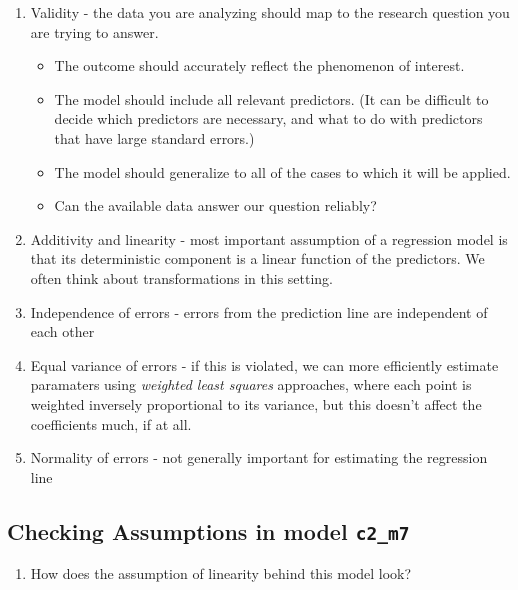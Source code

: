 \documentclass[]{book}
\providecommand{\tightlist}{%
  \setlength{\itemsep}{0pt}\setlength{\parskip}{0pt}}
\theoremstyle{definition}
\theoremstyle{definition}
\theoremstyle{definition}
\theoremstyle{remark}
\begin{document}
\begin{enumerate}
\def\labelenumi{\arabic{enumi}.}
\tightlist
\item
  Validity - the data you are analyzing should map to the research
  question you are trying to answer.

  \begin{itemize}
  \tightlist
  \item
    The outcome should accurately reflect the phenomenon of interest.
  \item
    The model should include all relevant predictors. (It can be
    difficult to decide which predictors are necessary, and what to do
    with predictors that have large standard errors.)
  \item
    The model should generalize to all of the cases to which it will be
    applied.
  \item
    Can the available data answer our question reliably?
  \end{itemize}
\item
  Additivity and linearity - most important assumption of a regression
  model is that its deterministic component is a linear function of the
  predictors. We often think about transformations in this setting.
\item
  Independence of errors - errors from the prediction line are
  independent of each other
\item
  Equal variance of errors - if this is violated, we can more
  efficiently estimate paramaters using \emph{weighted least squares}
  approaches, where each point is weighted inversely proportional to its
  variance, but this doesn't affect the coefficients much, if at all.
\item
  Normality of errors - not generally important for estimating the
  regression line
\end{enumerate}

\subsection{\texorpdfstring{Checking Assumptions in model
\texttt{c2\_m7}}{Checking Assumptions in model c2\_m7}}\label{checking-assumptions-in-model-c2_m7}

\begin{enumerate}
\def\labelenumi{\arabic{enumi}.}
\tightlist
\item
  How does the assumption of linearity behind this model look?
\end{enumerate}
\end{document}
